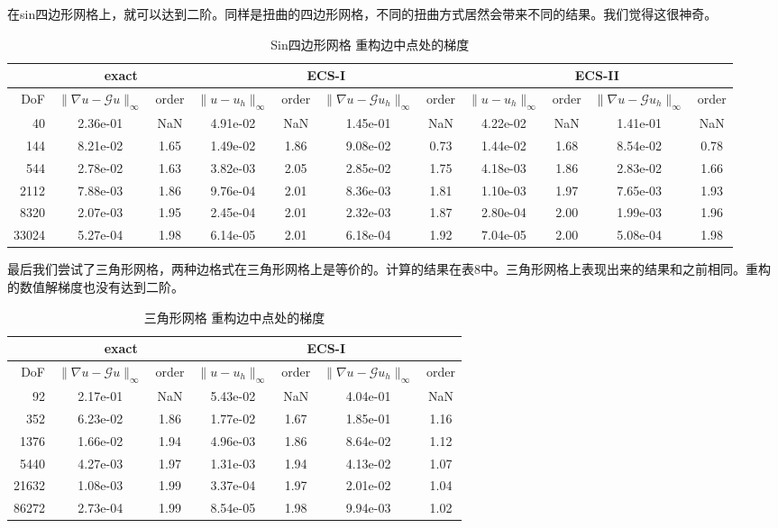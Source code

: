 \documentclass[12pt,a4paper]{article}
\theoremstyle{plain}
\begin{document}
在sin四边形网格上，就可以达到二阶。同样是扭曲的四边形网格，不同的扭曲方式居然会带来不同的结果。我们觉得这很神奇。

\begin{table}[h]
\centering
\scriptsize
\begin{tabular}{r|cc|cc|cc|cc|cc}
\hline
& \multicolumn{2}{c|}{exact} & \multicolumn{4}{c}{ECS-I} & \multicolumn{4}{|c}{ECS-II} \\
\hline
DoF & $\|\nabla u - \mathcal{G} u\|_\infty$ & order & $\|u - u_h\|_\infty$ & order & $\|\nabla u - \mathcal{G} u_h\|_\infty$ & order & $\|u - u_h\|_\infty$ & order & $\|\nabla u - \mathcal{G} u_h\|_\infty$ & order \\
\hline
40 & 2.36e-01 & NaN & 4.91e-02 & NaN & 1.45e-01 & NaN & 4.22e-02 & NaN & 1.41e-01 & NaN \\
144 & 8.21e-02 & 1.65 & 1.49e-02 & 1.86 & 9.08e-02 & 0.73 & 1.44e-02 & 1.68 & 8.54e-02 & 0.78 \\
544 & 2.78e-02 & 1.63 & 3.82e-03 & 2.05 & 2.85e-02 & 1.75 & 4.18e-03 & 1.86 & 2.83e-02 & 1.66 \\
2112 & 7.88e-03 & 1.86 & 9.76e-04 & 2.01 & 8.36e-03 & 1.81 & 1.10e-03 & 1.97 & 7.65e-03 & 1.93 \\
8320 & 2.07e-03 & 1.95 & 2.45e-04 & 2.01 & 2.32e-03 & 1.87 & 2.80e-04 & 2.00 & 1.99e-03 & 1.96 \\
33024 & 5.27e-04 & 1.98 & 6.14e-05 & 2.01 & 6.18e-04 & 1.92 & 7.04e-05 & 2.00 & 5.08e-04 & 1.98 \\
\hline
\end{tabular}
\caption{Sin四边形网格 重构边中点处的梯度}
\end{table}

最后我们尝试了三角形网格，两种边格式在三角形网格上是等价的。计算的结果在表8中。三角形网格上表现出来的结果和之前相同。重构的数值解梯度也没有达到二阶。

\begin{table}[h]
\centering
\scriptsize
\begin{tabular}{r|cc|cc|cc}
\hline
& \multicolumn{2}{c|}{exact} & \multicolumn{4}{c}{ECS-I} \\
\hline
DoF & $\|\nabla u - \mathcal{G} u\|_\infty$ & order & $\|u - u_h\|_\infty$ & order & $\|\nabla u - \mathcal{G} u_h\|_\infty$ & order \\
\hline
92 & 2.17e-01 & NaN & 5.43e-02 & NaN & 4.04e-01 & NaN \\
352 & 6.23e-02 & 1.86 & 1.77e-02 & 1.67 & 1.85e-01 & 1.16 \\
1376 & 1.66e-02 & 1.94 & 4.96e-03 & 1.86 & 8.64e-02 & 1.12 \\
5440 & 4.27e-03 & 1.97 & 1.31e-03 & 1.94 & 4.13e-02 & 1.07 \\
21632 & 1.08e-03 & 1.99 & 3.37e-04 & 1.97 & 2.01e-02 & 1.04 \\
86272 & 2.73e-04 & 1.99 & 8.54e-05 & 1.98 & 9.94e-03 & 1.02 \\
\hline
\end{tabular}
\caption{三角形网格 重构边中点处的梯度}
\end{table}
\end{document}
